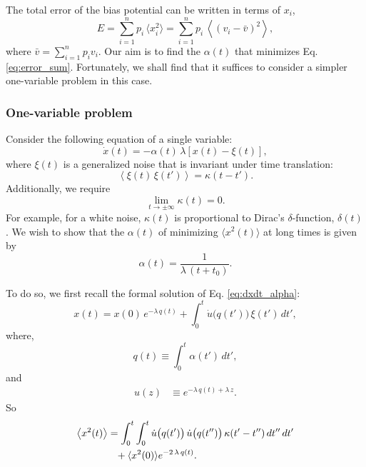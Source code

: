 \documentclass[reprint]{revtex4-1}
\newcommand{\Err}{E}
\begin{document}
The total error of the bias potential can be written in
terms of $x_i$,
\begin{equation}
\Err
=
\sum_{i = 1}^n p_i \, \langle x_i^2 \rangle
=
\sum_{i = 1}^n p_i \, \left\langle (v_i - \bar v)^2 \right\rangle,
\label{eq:error_sum}
\end{equation}
where
$\bar v = \sum_{i = 1}^n p_i v_i$.
%
Our aim is to find the $\alpha(t)$
that minimizes Eq. \eqref{eq:error_sum}.
%
Fortunately, we shall find that it suffices to consider
a simpler one-variable problem
in this case.



\subsubsection{One-variable problem}



Consider the following equation
of a single variable:
%
\begin{equation}
\dot x(t) = -\alpha(t) \, \lambda \left[ x(t) - \xi(t) \right],
\label{eq:dxdt_alpha}
\end{equation}
%
where $\xi(t)$ is a generalized noise
that is invariant under time translation:
%
\begin{equation}
\left\langle \xi(t) \, \xi(t') \right\rangle
=
\kappa(t - t').
\label{eq:noise_correlation}
\end{equation}
%
Additionally, we require
\begin{equation}
  \lim_{t \rightarrow \pm\infty} \kappa(t) = 0.
  \label{eq:kappat_limit}
\end{equation}
%
For example, for a white noise,
$\kappa(t)$ is proportional to
Dirac's $\delta$-function, $\delta(t)$.
%
We wish to show that the $\alpha(t)$
of minimizing $\langle x^2(t) \rangle$ at long times
is given by
%
\begin{equation}
  \alpha(t) = \frac{1}{\lambda \, (t + t_0)}.
\label{eq:alpha_opt}
\end{equation}



To do so, we first recall
the formal solution of Eq. \eqref{eq:dxdt_alpha}:
%
\begin{equation}
x(t) = x(0) \, e^{-\lambda \, q(t)}
+ \int_0^t \dot u\bigl( q(t') \bigr) \, \xi(t') \, dt',
\label{eq:xt_solution}
\end{equation}
%
where,
%
\begin{equation}
q(t) \equiv \int_0^t \alpha(t') \, dt',
\label{eq:qt_definition}
\end{equation}
%
and
%
\begin{align}
u(z)
&\equiv
e^{-\lambda \, q(t) + \lambda \, z}.
\label{eq:ut_definition}
\end{align}
So
\begin{align}
\left\langle x^2(t) \right\rangle
&=
\int_0^t \int_0^t
  \dot u\bigl( q(t') \bigr) \,
  \dot u\bigl( q(t'') \bigr) \,
  \kappa(t' - t'') \, dt'' \, dt'
\notag
\\
&\hphantom{=}
+\langle x^2(0) \rangle e^{-2 \, \lambda \, q(t)}.
\label{eq:x2t_average}
\end{align}
\end{document}
